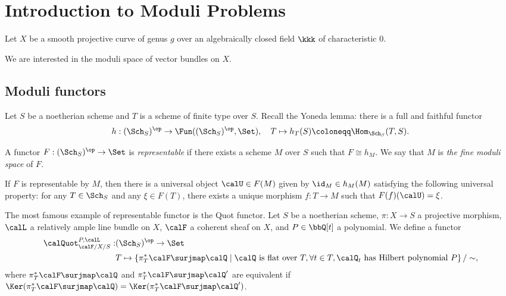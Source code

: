 \section{Introduction to Moduli Problems}

    Let \(X\) be a smooth projective curve of genus \(g\) over an algebraically closed field \(\kkk\) of characteristic \(0\).

    We are interested in the moduli space of vector bundles on \(X\).

\subsection{Moduli functors}

    Let \(S\) be a noetherian scheme and \(T\) is a scheme of finite type over \(S\).
    Recall the Yoneda lemma: 
    there is a full and faithful functor 
    \[ h : (\Sch_S)^{\op} \to \Fun((\Sch_S)^{\op}, \Set), \quad T \mapsto h_T(S) \coloneqq \Hom_{\Sch_S}(T, S). \]
    
    A functor \(F : (\Sch_S)^{\op} \to \Set\) is \emph{representable} if there exists a scheme \(M\) over \(S\) such that \(F \cong h_M\).
    We say that \(M\) is \emph{the fine moduli space} of \(F\).

    \begin{remark}\label{rmk:fine_moduli_space}
        If \(F\) is representable by \(M\), then there is a universal object \(\calU \in F(M)\) given by \(\id_M \in h_M(M)\) satisfying the following universal property: 
        for any \(T \in \Sch_S\) and any \(\xi \in F(T)\), there exists a unique morphism \(f : T \to M\) such that \(F(f)(\calU) = \xi\).
    \end{remark}

    The most famous example of representable functor is the Quot functor.
    Let \(S\) be a noetherian scheme, \(\pi:X \to S\) a projective morphism, \(\calL\) a relatively ample line bundle on \(X\), \(\calF\) a coherent sheaf on \(X\), and \(P \in \bbQ[t]\) a polynomial.
    We define a functor
    \begin{align*}
        \calQuot_{\calF/X/S}^{P,\calL} : & (\Sch_S)^{\op} \to \Set \\
        & T \mapsto 
        \left\{ 
            \pi^*_T \calF \surjmap \calQ 
        \;\middle|\;
            \calQ \text{ is flat over } T, \forall t \in T, \calQ_t \text{ has Hilbert polynomial } P
        \right\}/ \sim,
    \end{align*}
    where \(\pi^*_T \calF \surjmap \calQ\) and \(\pi^*_T \calF \surjmap \calQ'\) are equivalent if \(\Ker(\pi^*_T \calF \surjmap \calQ) = \Ker(\pi^*_T \calF \surjmap \calQ')\).

